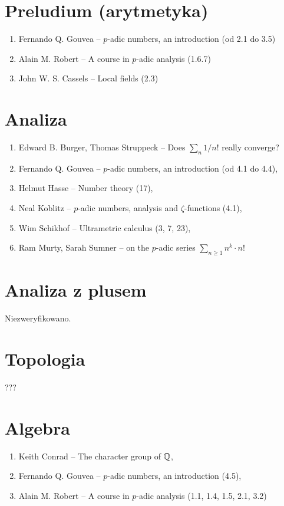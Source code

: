 \section{Preludium (arytmetyka)}
\begin{enumerate}
	\item Fernando Q. Gouvea -- $p$-adic numbers, an introduction (od 2.1 do 3.5)
	\item Alain M. Robert -- A course in $p$-adic analysis (1.6.7)
	\item John W. S. Cassels -- Local fields (2.3)
\end{enumerate}

\section{Analiza}
\begin{enumerate}
	\item Edward B. Burger, Thomas Struppeck -- Does $\sum_n 1/n!$ really converge? 
	\item Fernando Q. Gouvea -- $p$-adic numbers, an introduction (od 4.1 do 4.4),
	\item Helmut Hasse -- Number theory (17),
	\item Neal Koblitz -- $p$-adic numbers, analysis and $\zeta$-functions (4.1),
	\item Wim Schikhof -- Ultrametric calculus (3, 7, 23), 
	\item Ram Murty, Sarah Sumner -- on the $p$-adic series $\sum_{n \ge 1} n^k \cdot n!$
\end{enumerate}

\section{Analiza z plusem}
Niezweryfikowano.

\section{Topologia}
???

\section{Algebra}

\begin{enumerate}
	\item Keith Conrad -- The character group of $\mathbb Q$, 
	\item Fernando Q. Gouvea -- $p$-adic numbers, an introduction (4.5),
	\item Alain M. Robert -- A course in $p$-adic analysis (1.1, 1.4, 1.5, 2.1, 3.2)
\end{enumerate}





